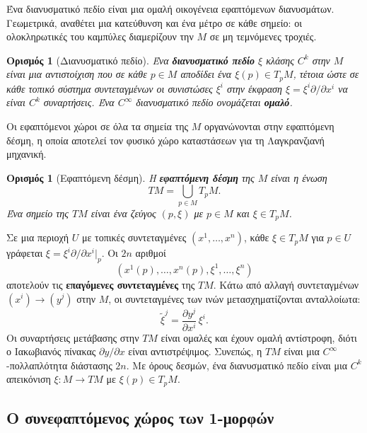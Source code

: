 \documentclass[11pt,a4paper,twoside,openright]{book}
\newtheorem{definition}[lemma]{Ορισμός}
\begin{document}
Ένα διανυσματικό πεδίο είναι μια ομαλή οικογένεια εφαπτόμενων διανυσμάτων. Γεωμετρικά, αναθέτει μια κατεύθυνση και ένα μέτρο σε κάθε σημείο: οι ολοκληρωτικές του καμπύλες διαμερίζουν την $M$ σε μη τεμνόμενες τροχιές.

\begin{definition}[Διανυσματικό πεδίο]
Ένα \textbf{διανυσματικό πεδίο} $\xi$ κλάσης $C^k$ στην $M$ είναι μια αντιστοίχιση που σε κάθε $p \in M$ αποδίδει ένα $\xi(p) \in T_pM$, τέτοια ώστε σε κάθε τοπικό σύστημα συντεταγμένων οι συνιστώσες $\xi^i$ στην έκφραση $\xi = \xi^i \partial / \partial x^i$ να είναι $C^k$ συναρτήσεις. Ένα $C^\infty$ διανυσματικό πεδίο ονομάζεται \textbf{ομαλό}.
\end{definition}

Οι εφαπτόμενοι χώροι σε όλα τα σημεία της $M$ οργανώνονται στην εφαπτόμενη δέσμη, η οποία αποτελεί τον φυσικό χώρο καταστάσεων για τη Λαγκρανζιανή μηχανική.

\begin{definition}[Εφαπτόμενη δέσμη]
Η \textbf{εφαπτόμενη δέσμη} της $M$ είναι η ένωση
\begin{equation}
TM = \bigcup_{p \in M} T_pM.
\end{equation}
Ένα σημείο της $TM$ είναι ένα ζεύγος $(p, \xi)$ με $p \in M$ και $\xi \in T_pM$.
\end{definition}

Σε μια περιοχή $U$ με τοπικές συντεταγμένες $(x^1, \dots, x^n)$, κάθε $\xi \in T_pM$ για $p \in U$ γράφεται $\xi = \xi^i \partial / \partial x^i|_p$. Οι $2n$ αριθμοί
\begin{equation}
(x^1(p), \dots, x^n(p), \xi^1, \dots, \xi^n)
\end{equation}
αποτελούν τις \textbf{επαγόμενες συντεταγμένες} της $TM$. Κάτω από αλλαγή συντεταγμένων $(x^i) \to (y^j)$ στην $M$, οι συντεταγμένες των ινών μετασχηματίζονται ανταλλοίωτα:
\begin{equation}
\tilde{\xi}^j = \frac{\partial y^j}{\partial x^i} \, \xi^i.
\end{equation}
Οι συναρτήσεις μετάβασης στην $TM$ είναι ομαλές και έχουν ομαλή αντίστροφη, διότι ο Ιακωβιανός πίνακας $\partial y / \partial x$ είναι αντιστρέψιμος. Συνεπώς, η $TM$ είναι μια $C^\infty$-πολλαπλότητα διάστασης $2n$. Με όρους δεσμών, ένα διανυσματικό πεδίο είναι μια $C^k$ απεικόνιση $\xi: M \to TM$ με $\xi(p) \in T_pM$.

\subsection{Ο συνεφαπτόμενος χώρος των 1-μορφών}
\end{document}
